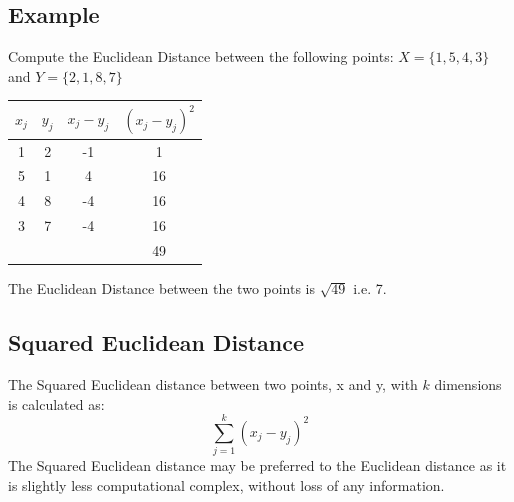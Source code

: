 \documentclass[a4paper,12pt]{report}
\begin{document}
\subsection{Example}
Compute the Euclidean Distance between the following points:
$X = \{1,5,4,3\}$ and $Y = \{2,1,8,7\}$

\begin{center}
	\begin{tabular}{|c|c|c|c|}
		\hline
		$x_j$	&	$y_j$	&   $x_j - y_j$	&	$(x_j - y_j)^2$	\\ \hline
		1	&	2	&	-1	&	1	\\
		5	&	1	&	4	&	16	\\
		4	&	8	&	-4	&	16	\\
		3	&	7	&	-4	&	16	\\ \hline
		&		&		&	49	\\ \hline
	\end{tabular}
\end{center}
The Euclidean Distance between the two points is $\sqrt{49}$ i.e. 7.

\subsection{Squared Euclidean Distance}
The Squared Euclidean distance between two points, x and y, with $k$ dimensions is calculated as:
\[ \sum^{k}_{j=1} ( x_j - y_j)^2  \]
The Squared Euclidean distance may be preferred to the Euclidean distance as it is slightly less computational complex, without loss of any information.

\end{document}
